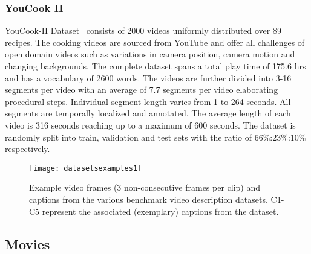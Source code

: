 \documentclass[10pt,journal,compsoc]{IEEEtran}
\begin{document}
\subsubsection{YouCook II}
\label{sec:youcookII}
YouCook-II Dataset~\cite{zhou2018towards} consists of 2000 videos uniformly distributed over 89 recipes. The cooking videos are sourced from YouTube and offer all challenges of open domain videos such as variations in camera position, camera motion and changing backgrounds. The complete dataset spans a total play time of 175.6 hrs and has a vocabulary of 2600 words. The videos are further divided into 3-16 segments per video  with an average of 7.7 segments per video elaborating procedural steps. Individual segment length varies from 1 to 264 seconds. All segments are temporally localized and annotated. The average length of each video is 316 seconds reaching up to a maximum of 600 seconds.  The dataset is randomly split into train, validation and test sets with the ratio of 66\%:23\%:10\% respectively.

\begin{figure*}[htbp] %
   \centering
   \texttt{[image: datasetsexamples1]} 
\vspace{-7mm}
   \caption{Example video frames (3 non-consecutive frames per clip) and captions from the various benchmark video description datasets. C1-C5 represent the associated (exemplary) captions from the dataset.}
\label{fig:datasetsexample}
\vspace{-5mm}
\end{figure*}

\subsection{Movies}
\label{sec:dataset-movies}
\end{document}
